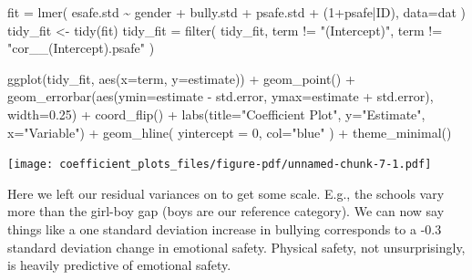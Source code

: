 \documentclass[
  letterpaper,
  DIV=11,
  numbers=noendperiod]{scrreprt}
\newenvironment{Shaded}{}{}
\newcommand{\AttributeTok}[1]{\textcolor[rgb]{0.49,0.56,0.16}{#1}}
\newcommand{\DecValTok}[1]{\textcolor[rgb]{0.25,0.63,0.44}{#1}}
\newcommand{\FloatTok}[1]{\textcolor[rgb]{0.25,0.63,0.44}{#1}}
\newcommand{\FunctionTok}[1]{\textcolor[rgb]{0.02,0.16,0.49}{#1}}
\newcommand{\NormalTok}[1]{#1}
\newcommand{\OtherTok}[1]{\textcolor[rgb]{0.00,0.44,0.13}{#1}}
\newcommand{\SpecialCharTok}[1]{\textcolor[rgb]{0.25,0.44,0.63}{#1}}
\newcommand{\StringTok}[1]{\textcolor[rgb]{0.25,0.44,0.63}{#1}}
\begin{document}
\begin{Shaded}
\begin{Highlighting}[]
\NormalTok{fit }\OtherTok{=} \FunctionTok{lmer}\NormalTok{( esafe.std }\SpecialCharTok{\textasciitilde{}}\NormalTok{ gender }\SpecialCharTok{+}\NormalTok{ bully.std }\SpecialCharTok{+}\NormalTok{ psafe.std }\SpecialCharTok{+}\NormalTok{ (}\DecValTok{1}\SpecialCharTok{+}\NormalTok{psafe}\SpecialCharTok{|}\NormalTok{ID),}
          \AttributeTok{data=}\NormalTok{dat )}
\NormalTok{tidy\_fit }\OtherTok{\textless{}{-}} \FunctionTok{tidy}\NormalTok{(fit)}
\NormalTok{tidy\_fit }\OtherTok{=} \FunctionTok{filter}\NormalTok{( tidy\_fit,}
\NormalTok{                   term }\SpecialCharTok{!=} \StringTok{"(Intercept)"}\NormalTok{,}
\NormalTok{                   term }\SpecialCharTok{!=} \StringTok{"cor\_\_(Intercept).psafe"}\NormalTok{ )}

\FunctionTok{ggplot}\NormalTok{(tidy\_fit, }\FunctionTok{aes}\NormalTok{(}\AttributeTok{x=}\NormalTok{term, }\AttributeTok{y=}\NormalTok{estimate)) }\SpecialCharTok{+}
  \FunctionTok{geom\_point}\NormalTok{() }\SpecialCharTok{+}
  \FunctionTok{geom\_errorbar}\NormalTok{(}\FunctionTok{aes}\NormalTok{(}\AttributeTok{ymin=}\NormalTok{estimate }\SpecialCharTok{{-}}\NormalTok{ std.error, }\AttributeTok{ymax=}\NormalTok{estimate }\SpecialCharTok{+}\NormalTok{ std.error), }\AttributeTok{width=}\FloatTok{0.25}\NormalTok{) }\SpecialCharTok{+}
  \FunctionTok{coord\_flip}\NormalTok{() }\SpecialCharTok{+}
  \FunctionTok{labs}\NormalTok{(}\AttributeTok{title=}\StringTok{"Coefficient Plot"}\NormalTok{, }\AttributeTok{y=}\StringTok{"Estimate"}\NormalTok{, }\AttributeTok{x=}\StringTok{"Variable"}\NormalTok{) }\SpecialCharTok{+}
  \FunctionTok{geom\_hline}\NormalTok{( }\AttributeTok{yintercept =} \DecValTok{0}\NormalTok{, }\AttributeTok{col=}\StringTok{"blue"}\NormalTok{ ) }\SpecialCharTok{+}
  \FunctionTok{theme\_minimal}\NormalTok{()}
\end{Highlighting}
\end{Shaded}

\texttt{[image: coefficient\_plots\_files/figure-pdf/unnamed-chunk-7-1.pdf]}

Here we left our residual variances on to get some scale. E.g., the
schools vary more than the girl-boy gap (boys are our reference
category). We can now say things like a one standard deviation increase
in bullying corresponds to a -0.3 standard deviation change in emotional
safety. Physical safety, not unsurprisingly, is heavily predictive of
emotional safety.
\end{document}
